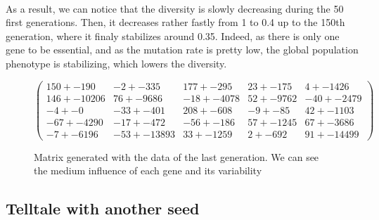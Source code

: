 \documentclass[]{report} %
\begin{document}
    \paragraph*{}
    As a result, we can notice that the diversity is slowly decreasing during the 50 first generations. Then, it decreases rather fastly from 1 to 0.4 up to the 150th generation, where it finaly stabilizes around 0.35. Indeed, as there is only one gene to be essential, and as the mutation rate is pretty low, the global population phenotype is stabilizing, which lowers the diversity.

    \begin{figure}[H] 
            \centering
            \small
    $
            \begin{pmatrix}
                150 +- 190 & -2 +- 335 & 177 +- 295 & 23 +- 175 & 4 +- 1426 \\
                146 +- 10206 & 76 +- 9686 & -18 +- 4078 & 52 +- 9762 & -40 +- 2479 \\
                -4 +- 0 & -33 +- 401 & 208 +- 608 & -9 +- 85 & 42 +- 1103 \\
                -67 +- 4290 & -17 +- 472 & -56 +- 186 & 57 +- 1245 & 67 +- 3686 \\
                -7 +- 6196 & -53 +- 13893 & 33 +- 1259 & 2 +- 692 & 91 +- 1449 9 
            \end{pmatrix}
    $
            \caption{\footnotesize Matrix generated with the data of the last generation. We can see the medium influence of each gene and its variability}
            \label{mat:telltale}
    \end{figure}
    
    
\subsection{Telltale with another seed}
\end{document}

